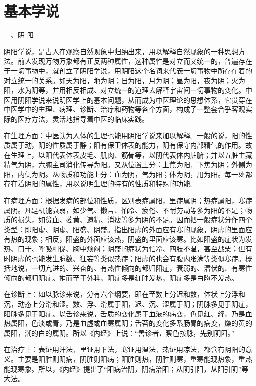 \documentclass[12pt,UTF8]{ctexbook}
\begin{document}
\section{基本学说}

一、阴 阳

阴阳学说，是古人在观察自然现象中归纳出来，用以解释自然现象的一种思想方法。前人发现万物万象都有正反两种属性，这种属性是对立而又统一的，普遍存在于一切事物中，就创立了阴阳学说，用阴阳这个名词来代表一切事物中所存在着的对立统一的关系。如天为阳，地为阴；日为阳，月为阴；昼为阳，夜为阴；火为阳，水为阴等，并用相反相成、对立统一的道理去解释宇宙间一切事物的变化。中医用阴阳学说来说明医学上的基本问题，从而成为中医理论的思想体系，它贯穿在中医学中的生理、病理、诊断、治疗和药物等各个方面，构成了一整套合乎客观实际的医疗方法，灵活地指导着中医的临床实践。

在生理方面：中医认为人体的生理也能用阴阳学说来加以解释。一般的说，阳的性质属于动，阴的性质属于静；阳有保卫体表的能力，阴有保守内部精气的作用。故在生理上，以阳代表体表皮毛、肌肉、筋骨等，以阴代表体内脏腑；并以五脏主藏精气为阴，六腑主司消化传导为阳。又从位置上分：上焦为阳，下焦为阴；外侧为阳，内侧为阴。从物质和功能上分：血为阴，气为阳；体为阴，用为阳。每一处都存在着阴阳的属性，用以说明生理的特有的性质和特殊的功能。

在病理方面：根据发病的部位和性质，区别表症属阳，里症属阴；热症属阳，寒症属阴。凡是机能衰弱，如少气、懒言、怕冷、疲倦、不耐劳动等多为阳的不足；物质的损失，如贫血、萎黄、遗精、消瘦等多为阴的不足。因而把一般症状分作四个类型：即阳虚、阴虚、阳盛、阴盛。指出阳虚的外面应有寒的现象，阴虚的里面应有热的现象；相反，阳盛的外面应该热，阴盛的里面应该寒。比如阳盛的症状为发热、口干、呼吸粗促、胸中烦闷；阴盛的症状为怕冷、四肢不温，甚至战栗；但有时阴虚的也能发生脉数、狂妄等类似热症；阳虚的也会有腹内胀满等类似寒症。概括地说，一切亢进的、兴奋的、有热性倾向的都归阳症，衰弱的、潜伏的、有寒性倾向的都归阴症。推而至于外科，阳症多是红肿发热，阴症多是白陷不发热。

在诊断上：如以脉诊来说，分有六个纲要，即在至数上分迟和数，体状上分浮和沉，动态上分滑和涩。数、浮、滑属于阳，迟、沉、涩属于阴；阴脉多见于阴症，阳脉多见于阳症。以舌诊来说，舌质的变化属于血液的病变，色见红、绛，乃是血热属阳，色淡或青，乃是血虚或血寒属阴；舌苔的变化多系肠胃的病变，燥的黄的属阳，潮的白的属阴。所以《内经》上说：“善诊者，察色按脉，先别阴阳。”

在治疗上：表证用汗法，里证用下法，寒证用温法，热证用凉法，都含有阴阳的意义。主要是阳胜则阴病，阴胜则阳病；阳胜则热，阴胜则寒，重寒能现热象，重热能现寒象。所以，《内经》提出了“阳病治阴，阴病治阳；从阴引阳，从阳引阴”等大法。
\end{document}
